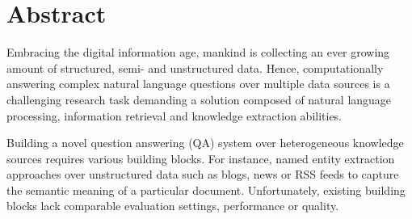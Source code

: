 \chapter*{Abstract}
Embracing the digital information age, mankind is collecting an ever growing amount of structured, semi- and unstructured data. 
Hence, computationally answering complex natural language questions over multiple data sources is a challenging research task demanding a solution composed of natural language processing, information retrieval and knowledge extraction abilities. 

Building a novel question answering (QA) system over heterogeneous knowledge sources requires various building blocks.
For instance, named entity extraction approaches over unstructured data such as blogs, news or RSS feeds to capture the semantic meaning of a particular document.
Unfortunately, existing building blocks lack comparable evaluation settings, performance or quality. 

